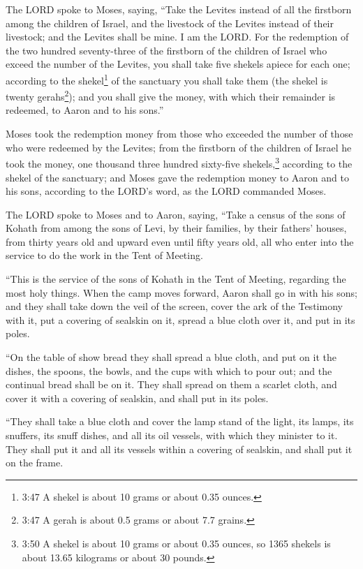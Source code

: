 \myverse{}The LORD spoke to Moses, saying,
\myverse{}“Take the Levites instead of all the firstborn among the children of Israel,
and the livestock of the Levites instead of their livestock; and the Levites shall be mine. I am the LORD.
\myverse{}For the redemption of the two hundred seventy-three of the firstborn of the
children of Israel who exceed the number of the Levites,
\myverse{}you shall take five shekels apiece for each one; according to the shekel\footnote{ 3:47 A shekel is about 10 grams or about 0.35 ounces.} of the sanctuary you shall take them
(the shekel is twenty gerahs\footnote{ 3:47 A gerah is about 0.5 grams or about 7.7 grains.});
\myverse{}and you shall give the money, with which their remainder is redeemed, to Aaron
and to his sons.”


\myverse{}Moses took the redemption money from those who exceeded the number
of those who were redeemed by the Levites;
\myverse{}from the firstborn of the children of Israel he took the money, one thousand
three hundred sixty-five shekels,\footnote{ 3:50 A shekel is about 10 grams or about 0.35 ounces, so 1365 shekels is about 13.65 kilograms or
	about 30 pounds.} according to the shekel of the sanctuary;
\myverse{}and Moses gave the redemption money to Aaron and to his sons, according to
the LORD’s word, as the LORD commanded Moses.


\mychapter{} \myverse*{}The LORD spoke to Moses and to Aaron, saying,
\myverse{}“Take a census of the sons of Kohath from among the sons of Levi, by their families,
by their fathers’ houses,
\myverse{}from thirty years old and upward even until fifty years old, all who enter into
the service to do the work in the Tent of Meeting.


\myverse{}“This is the service of the sons of Kohath in the Tent of Meeting,
regarding the most holy things.
\myverse{}When the camp moves forward, Aaron shall go in with his sons; and they shall
take down the veil of the screen, cover the ark of the Testimony with it,
\myverse{}put a covering of sealskin on it, spread a blue cloth over it, and put in its
poles.


\myverse{}“On the table of show bread they shall spread a blue cloth, and
put on it the dishes, the spoons, the bowls, and the cups with which to pour out; and the continual bread
shall be on it.
\myverse{}They shall spread on them a scarlet cloth, and cover it with a covering of sealskin,
and shall put in its poles.


\myverse{}“They shall take a blue cloth and cover the lamp stand of the light,
its lamps, its snuffers, its snuff dishes, and all its oil vessels, with which they minister to it.
\myverse{}They shall put it and all its vessels within a covering of sealskin, and shall
put it on the frame.


